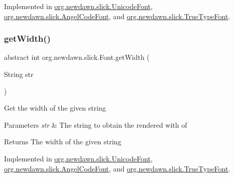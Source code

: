 Implemented in \mbox{\hyperlink{classorg_1_1newdawn_1_1slick_1_1_unicode_font_a4f245d11a64ccc71aa9b1d48d89cbc09}{org.\+newdawn.\+slick.\+Unicode\+Font}}, \mbox{\hyperlink{classorg_1_1newdawn_1_1slick_1_1_angel_code_font_aa462c138af142eb6086c66205b0456af}{org.\+newdawn.\+slick.\+Angel\+Code\+Font}}, and \mbox{\hyperlink{classorg_1_1newdawn_1_1slick_1_1_true_type_font_a16d8fe4babd9423e3cc197662889faaf}{org.\+newdawn.\+slick.\+True\+Type\+Font}}.

\mbox{\label{interfaceorg_1_1newdawn_1_1slick_1_1_font_a6dbdd5828730e18fcf0612307d0394b1}} 
\subsubsection{\texorpdfstring{get\+Width()}{getWidth()}}
{\footnotesize\ttfamily abstract int org.\+newdawn.\+slick.\+Font.\+get\+Width (\begin{DoxyParamCaption}\item[{String}]{str }\end{DoxyParamCaption})\hspace{0.3cm}{\ttfamily [abstract]}}

Get the width of the given string


\begin{DoxyParams}{Parameters}
{\em str} & The string to obtain the rendered with of \\
\hline
\end{DoxyParams}
\begin{DoxyReturn}{Returns}
The width of the given string 
\end{DoxyReturn}


Implemented in \mbox{\hyperlink{classorg_1_1newdawn_1_1slick_1_1_unicode_font_a5a1aa518193d31f1407d3cb5e5997ca8}{org.\+newdawn.\+slick.\+Unicode\+Font}}, \mbox{\hyperlink{classorg_1_1newdawn_1_1slick_1_1_angel_code_font_a0202edaba33e21e6bfb3c7dbaebbbb92}{org.\+newdawn.\+slick.\+Angel\+Code\+Font}}, and \mbox{\hyperlink{classorg_1_1newdawn_1_1slick_1_1_true_type_font_ad5614f14f3194de0b68f9fe095ab0bfa}{org.\+newdawn.\+slick.\+True\+Type\+Font}}.

